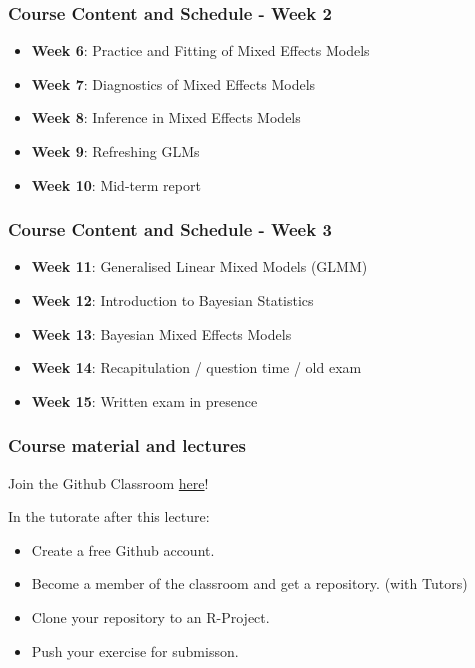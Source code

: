 \documentclass{beamer}
\begin{document}
\begin{frame}
\frametitle{Course Content and Schedule - Week 2}
\begin{itemize}
    \item \textbf{Week 6}: Practice and Fitting of Mixed Effects Models
    \item \textbf{Week 7}: Diagnostics of Mixed Effects Models
    \item \textbf{Week 8}: Inference in Mixed Effects Models
    \item \textbf{Week 9}: Refreshing GLMs
    \item \textbf{Week 10}: Mid-term report
\end{itemize}
\end{frame}

\begin{frame}
\frametitle{Course Content and Schedule - Week 3}
\begin{itemize}
    \item \textbf{Week 11}: Generalised Linear Mixed Models (GLMM)
    \item \textbf{Week 12}: Introduction to Bayesian Statistics
    \item \textbf{Week 13}: Bayesian Mixed Effects Models
    \item \textbf{Week 14}: Recapitulation / question time / old exam
    \item \textbf{Week 15}: Written exam in presence 
\end{itemize}
\end{frame}

\begin{frame}
\frametitle{Course material and lectures}

Join the Github Classroom \href{https://github.com/orgs/EMDS-Statistics/repositories}{here}!

\vspace{2em}

In the tutorate after this lecture:
\begin{itemize}
    \item Create a free Github account.
    \item Become a member of the classroom and get a repository. (with Tutors)
    \item Clone your repository to an R-Project.
    \item Push your exercise for submisson.
\end{itemize}
\vspace{2em}

\end{frame}
\end{document}
